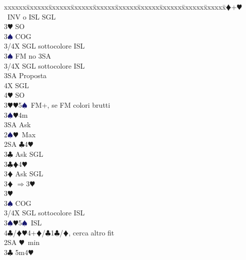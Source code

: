 \documentclass[a4paper,italian]{article}
\newcommand{\BC}{\textcolor{OliveGreen}{$\clubsuit$}}
\newcommand{\BD}{\textcolor{RedOrange}{$\vardiamondsuit$}}
\newcommand{\BH}{\textcolor{Red2}{$\varheartsuit${}}}
\newcommand{\BS}{\textcolor{MidnightBlue}{$\spadesuit${}}}
\newenvironment{bidtable}
{\begin{tabbing}

    xxxxxx\=xxxxxx\=xxxxxx\=xxxxxx\=xxxxxx\=xxxxxx\=xxxxxx\=xxxxxx\=xxxxxx\=xxxxxx\=\kill}
{\end{tabbing} }%
\begin{document}
\begin{multicols}{2}
\begin{bidtable}
                                            3\BD {}+\BH\ INV o ISL SGL\+\\
                                            3\BH \> SO\+\\
                                            3\BS \> COG\\
                                            3/4X \> SGL sottocolore ISL\-\\
                                            3\BS \> FM no 3SA\+\\
                                            3/4X \> SGL sottocolore ISL\-\\
                                            3SA \> Proposta\+\\
                                            4X \> SGL\\
                                            4\BH \> SO\-\-\\
                                            3\BH {}\BH 5\BS\ FM+, se FM colori brutti\\
                                            3\BS {}\BH 4m\+\\
                                            3SA \> Ask\-\-\\
                                            2\BS {}\BH\ Max\+\\
                                            2SA \BC 4\BH \+\\
                                            3\BC \> Ask SGL\-\\
                                            3\BC {}\BD 4\BH \+\\
                                            3\BD \> Ask SGL\-\\
                                            3\BD \> $\Rightarrow$3\BH\+\\
                                            3\BH\+\\
                                            3\BS \> COG\\
                                            3/4X\> SGL sottocolore ISL\-\-\\
                                            3\BS {}\BH 5\BS\ ISL\\
                                            4\BC/\BD {}\BH4+\BD/\BC1\BC/\BD, cerca altro fit \-\\
                                            2SA \BH\ min\+\\
                                            3\BC \> 5m4\BH \+\\

\end{bidtable}
\end{multicols}
\end{document}
